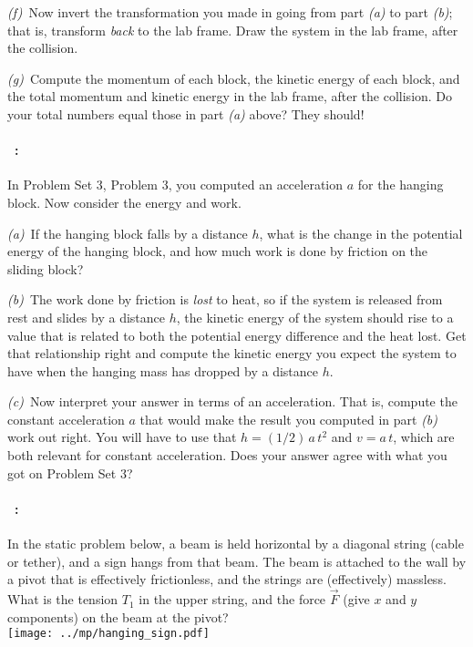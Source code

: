 \documentclass[12pt]{article}
\begin{document}
\textsl{(f)}~Now invert the transformation you made in going from part
\textsl{(a)} to part \textsl{(b)}; that is, transform \emph{back} to
the lab frame. Draw the system in the lab frame, after the collision.

\textsl{(g)}~Compute the momentum of each block, the kinetic energy of
each block, and the total momentum and kinetic energy in the lab
frame, after the collision. Do your total numbers equal those in part
\textsl{(a)} above? They should!

\paragraph{\problemname~\theproblem:}\label{blocks}%
In Problem Set 3, Problem 3, you computed an acceleration $a$ for the
hanging block. Now consider the energy and work.

\textsl{(a)}~If the hanging block falls by a distance $h$, what is
the change in the potential energy of the hanging block, and how much
work is done by friction on the sliding block?

\textsl{(b)}~The work done by friction is \emph{lost} to heat, so if
the system is released from rest and slides by a distance $h$, the
kinetic energy of the system should rise to a value that is related to both the
potential energy difference and the heat lost. Get that relationship
right and compute the kinetic energy you expect the system to have
when the hanging mass has dropped by a distance $h$.

\textsl{(c)}~Now interpret your answer in terms of an acceleration.
That is, compute the constant acceleration $a$ that would make the
result you computed in part \textsl{(b)} work out right. You will have
to use that $h = (1/2)\,a\,t^2$ and $v=a\,t$, which are both relevant
for constant acceleration. Does your answer agree with what you got on
Problem Set 3?

\paragraph{\problemname~\theproblem:}%
In the static problem below, a beam is held horizontal by a diagonal
string (cable or tether), and a sign hangs from that beam. The beam is
attached to the wall by a pivot that is effectively frictionless, and
the strings are (effectively) massless. What is the tension $T_1$ in
the upper string, and the force $\vec{F}$ (give $x$ and $y$
components) on the beam at the pivot?
\\ \texttt{[image: ../mp/hanging\_sign.pdf]}
\end{document}
